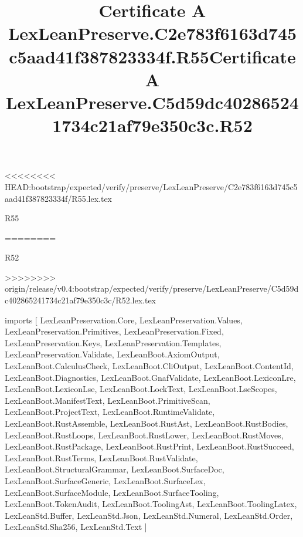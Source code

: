 <<<<<<<< HEAD:bootstrap/expected/verify/preserve/LexLeanPreserve/C2e783f6163d745c5aad41f387823334f/R55.lex.tex
\begin{lexlean}{R55}
\title{Certificate A LexLeanPreserve.C2e783f6163d745c5aad41f387823334f.R55}
========
\begin{lexlean}{R52}
\title{Certificate A LexLeanPreserve.C5d59dc402865241734c21af79e350c3c.R52}
>>>>>>>> origin/release/v0.4:bootstrap/expected/verify/preserve/LexLeanPreserve/C5d59dc402865241734c21af79e350c3c/R52.lex.tex
\begin{coremodule}
imports [
  LexLeanPreservation.Core,
  LexLeanPreservation.Values,
  LexLeanPreservation.Primitives,
  LexLeanPreservation.Fixed,
  LexLeanPreservation.Keys,
  LexLeanPreservation.Templates,
  LexLeanPreservation.Validate,
  LexLeanBoot.AxiomOutput,
  LexLeanBoot.CalculusCheck,
  LexLeanBoot.CliOutput,
  LexLeanBoot.ContentId,
  LexLeanBoot.Diagnostics,
  LexLeanBoot.GnafValidate,
  LexLeanBoot.LexiconLre,
  LexLeanBoot.LexiconLse,
  LexLeanBoot.LockText,
  LexLeanBoot.LseScopes,
  LexLeanBoot.ManifestText,
  LexLeanBoot.PrimitiveScan,
  LexLeanBoot.ProjectText,
  LexLeanBoot.RuntimeValidate,
  LexLeanBoot.RustAssemble,
  LexLeanBoot.RustAst,
  LexLeanBoot.RustBodies,
  LexLeanBoot.RustLoops,
  LexLeanBoot.RustLower,
  LexLeanBoot.RustMoves,
  LexLeanBoot.RustPackage,
  LexLeanBoot.RustPrint,
  LexLeanBoot.RustSucceed,
  LexLeanBoot.RustTerms,
  LexLeanBoot.RustValidate,
  LexLeanBoot.StructuralGrammar,
  LexLeanBoot.SurfaceDoc,
  LexLeanBoot.SurfaceGeneric,
  LexLeanBoot.SurfaceLex,
  LexLeanBoot.SurfaceModule,
  LexLeanBoot.SurfaceTooling,
  LexLeanBoot.TokenAudit,
  LexLeanBoot.ToolingAst,
  LexLeanBoot.ToolingLatex,
  LexLeanStd.Buffer,
  LexLeanStd.Json,
  LexLeanStd.Numeral,
  LexLeanStd.Order,
  LexLeanStd.Sha256,
  LexLeanStd.Text
]


\end{coremodule}
\end{lexlean}
\end{lexlean}
